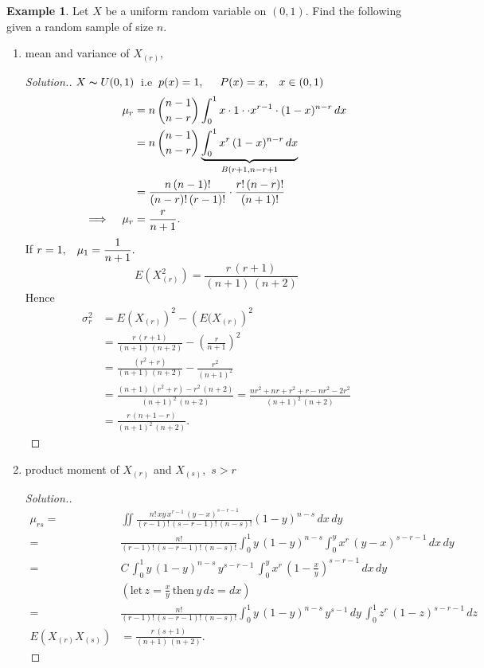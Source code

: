 \documentclass[12pt,a4paper]{report}
\theoremstyle{definition}
\newtheorem{exa}[thm]{Example}
\theoremstyle{plain}
\begin{document}
\begin{exa}
Let $X$ be a uniform random variable on $(0,1)$. Find the following given a random sample of size $n$.
\begin{enumerate}
\item[(a)] mean and variance of $X_{(r)}$, 
\begin{proof}[Solution.]
$X\thicksim U(0,1)\,$ i.e $\, p(x) = 1, \hspace{0.5cm} P(x)  = x, \hspace{0.3cm} x \in (0, 1)$
\begin{align*}
\mu_r & = n \, \binom{n - 1}{n - r}\int^1_0x\cdot 1\cdot \cdot x^{r  - 1}\cdot (1 - x)^{n - r}\, dx\\
& = n\, \binom{n - 1}{n - r}\underbrace{\int^1_0x^r\, (1 - x)^{n - r}\, dx}_{B(r + 1, n - r+ 1}\\
& = \frac{n\, (n - 1)!}{(n - r)!\, (r - 1)!}\cdot\frac{r!\, (n - r)!}{(n + 1)!}\\
\implies\hspace{0.3cm} \mu_r  & = \frac{r}{n + 1}.
\end{align*}
If $r = 1, \hspace{0.3cm} \mu_1 = \dfrac{1}{n + 1}.$
$$E\left(X_{(r)}^2\right) = \frac{r\, (r + 1)}{(n + 1)\, (n + 2)}$$
Hence
\begin{align*}
\sigma^2_r & = E\left(X_{(r)}\right)^2  - \left(E(X_{(r)}\right)^2\\
& = \frac{r\, (r + 1)}{(n + 1)\, (n + 2)} - \left(\frac{r}{n + 1}\right)^2\\
& = \frac{(r^2  + r)}{(n + 1)\, (n + 2)} - \frac{r^2}{(n + 1)^2}\\
& = \frac{(n + 1)\, (r^2 + r) - r^2\, (n + 2)}{(n + 1)^2 \, (n + 2)}
 = \frac{nr^2 + nr + r^2 + r - nr^2 - 2r^2}{(n + 1)^2\, (n + 2)}\\
& = \frac{r\, (n + 1 - r)}{(n + 1)^2 \, (n + 2)}.
\end{align*}
\end{proof}

\item[(b)] product moment of $X_{(r)}$ and $X_{(s)}$,  $\, s>r$
\begin{proof}[Solution.]
\begin{align*}
\mu_{rs}  = & \iint \frac{n!\, xy\, x^{r - 1}\, (y - x)^{s - r - 1}}{(r - 1)!\, (s - r - 1)!\, (n - s)!}(1 - y)^{n -s}\, dx\, dy\\
= & \frac{n!}{(r - 1)!\, (s - r - 1)!\, (n - s)!}\int_0^1y\, (1 - y)^{n - s}\int^y_0 x^r\, (y - x)^{s - r - 1}\, dx \, dy\\
= & C\, \int^1_0y\, (1 - y)^{n - s}\, y^{s - r - 1}\, \int^y_0x^r\, \left(1 - \frac{x}{y}\right)^{s-r-1}\, dx\, dy\\
 & (\text{let}\, z = \frac{x}{y}\, \text{then}\, y\, dz = dx)\\
= & \frac{n!}{(r - 1)!\, (s - r - 1)!\, (n - s)!}\int^1_0y\, (1 - y)^{n - s}\, y^{s - 1}\, dy\, \int^1_0z^r\, (1 - z)^{s-r-1}\, dz\\
E\left(X_{(r)}X_{(s)}\right) & = \frac{r \, (s + 1)}{(n + 1)\, (n + 2)}.
\end{align*}
\end{proof}



\end{enumerate}
\end{exa}
\end{document}
